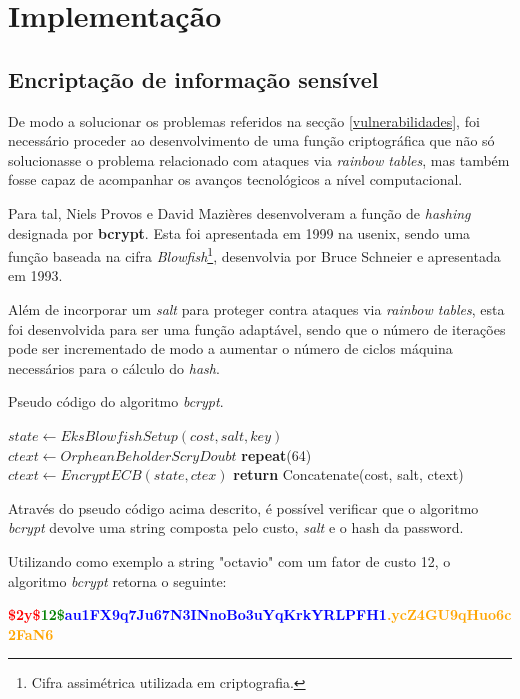 \chapter{Implementação}

\section{Encriptação de informação sensível} \label{encryption}

De modo a solucionar os problemas referidos na secção \ref{vulnerabilidades}, foi necessário proceder ao desenvolvimento de uma função criptográfica que não só solucionasse o problema relacionado com ataques via \emph{rainbow tables}, mas também fosse capaz de acompanhar os avanços tecnológicos a nível computacional.

Para tal, Niels Provos e David Mazières desenvolveram a função de \emph{hashing} designada por \textbf{bcrypt}\cite{provos1999future}. Esta foi apresentada em 1999 na \gls{usenix}, sendo uma função baseada na cifra \emph{Blowfish}\footnote{Cifra assimétrica utilizada em criptografia.}, desenvolvia por Bruce Schneier e apresentada em 1993.

Além de incorporar um \emph{salt} para proteger contra ataques via \emph{rainbow tables}, esta foi desenvolvida para ser uma função adaptável, sendo que o número de iterações pode ser incrementado de modo a aumentar o número de ciclos máquina necessários para o cálculo do \emph{hash}. 

\begin{algorithm}
    \caption{Pseudo código do algoritmo \emph{bcrypt}.}
    \begin{algorithmic}[1]
        \State $state\gets EksBlowfishSetup(cost,salt,key)$
        \State $ctext\gets OrpheanBeholderScryDoubt$
        \State \textbf{repeat}(64)
        \State \indent $ctext\gets EncryptECB(state, ctex)$
        \State \textbf{return} Concatenate(cost, salt, ctext)
    \EndFunction
    \end{algorithmic}
\end{algorithm}

Através do pseudo código acima descrito, é possível verificar que o algoritmo \emph{bcrypt} devolve uma string composta pelo custo, \emph{salt} e o hash da password.

Utilizando como exemplo a string "octavio" com um fator de custo 12, o algoritmo \emph{bcrypt} retorna o seguinte:

\begin{center}
    \textbf{\textcolor{red}{\$2y\$}\textcolor{green}{12\$}\textcolor{blue}{au1FX9q7Ju67N3INnoBo3uYqKrkYRLPFH1}\textcolor{orange}{.ycZ4GU9qHuo6c2FaN6}}
\end{center} 

